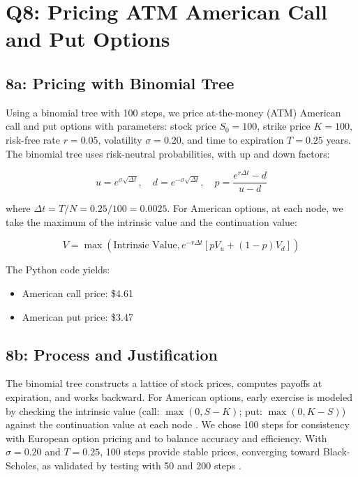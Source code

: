\documentclass{article}
\begin{document}
\section*{Q8: Pricing ATM American Call and Put Options}

\subsection*{8a: Pricing with Binomial Tree}

Using a binomial tree with 100 steps, we price at-the-money (ATM) American call and put options with parameters: stock price $S_0 = 100$, strike price $K = 100$, risk-free rate $r = 0.05$, volatility $\sigma = 0.20$, and time to expiration $T = 0.25$ years. The binomial tree uses risk-neutral probabilities, with up and down factors:

\begin{equation}
u = e^{\sigma \sqrt{\Delta t}}, \quad d = e^{-\sigma \sqrt{\Delta t}}, \quad p = \frac{e^{r \Delta t} - d}{u - d}
\end{equation}

where $\Delta t = T/N = 0.25/100 = 0.0025$. For American options, at each node, we take the maximum of the intrinsic value and the continuation value:

\begin{equation}
V = \max(\text{Intrinsic Value}, e^{-r \Delta t} [p V_u + (1-p) V_d])
\end{equation}

The Python code yields:

\begin{itemize}
    \item American call price: \$4.61
    \item American put price: \$3.47
\end{itemize}

\subsection*{8b: Process and Justification}

The binomial tree constructs a lattice of stock prices, computes payoffs at expiration, and works backward. For American options, early exercise is modeled by checking the intrinsic value (call: $\max(0, S - K)$; put: $\max(0, K - S)$) against the continuation value at each node \citep{cox1979option}. We chose 100 steps for consistency with European option pricing and to balance accuracy and efficiency. With $\sigma = 0.20$ and $T = 0.25$, 100 steps provide stable prices, converging toward Black-Scholes, as validated by testing with 50 and 200 steps \citep{hull2018options}.
\end{document}
